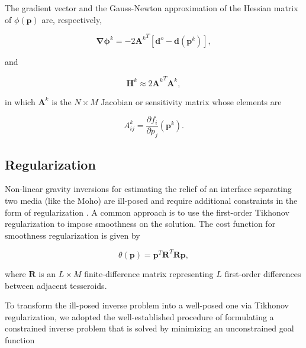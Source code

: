 The gradient vector and the Gauss-Newton approximation of the Hessian matrix
of $\phi(\mathbf{p})$ are, respectively,

\begin{equation}
    \mathbf{\nabla\phi}^k = -2{\mathbf{A}^k}^T[\mathbf{d}^o - \mathbf{d}(\mathbf{p}^k)],
    \label{eq:moho-gradient}
\end{equation}

\noindent
and

\begin{equation}
    \mathbf{H}^k \approx 2{\mathbf{A}^k}^T{\mathbf{A}^k},
    \label{eq:moho-hessian}
\end{equation}

\noindent in which
$\mathbf{A}^k$ is the $N \times M$ Jacobian or sensitivity matrix
whose elements are

\begin{equation}
    A_{ij}^k = \dfrac{\partial f_i}{\partial p_j}(\mathbf{p}^k).
    \label{eq:moho-jacobian}
\end{equation}



\subsection{Regularization}

Non-linear gravity inversions for estimating the relief of an interface
separating two media (like the Moho) are ill-posed and require additional
constraints in the form of regularization \citep{silva2001b}.
A common approach is to use the first-order Tikhonov regularization
\citep{tikhonov1977} to impose smoothness on the solution.
The cost function for smoothness regularization is given by

\begin{equation}
    \theta(\mathbf{p}) = \mathbf{p}^T\mathbf{R}^T\mathbf{R}\mathbf{p},
    \label{eq:moho-regul}
\end{equation}

\noindent where $\mathbf{R}$ is an $L \times M$ finite-difference matrix
representing $L$ first-order differences between adjacent tesseroids.

To transform the ill-posed inverse problem into a well-posed one via Tikhonov
regularization, we adopted the well-established procedure
of formulating a constrained inverse problem that is solved by minimizing an
unconstrained goal function

